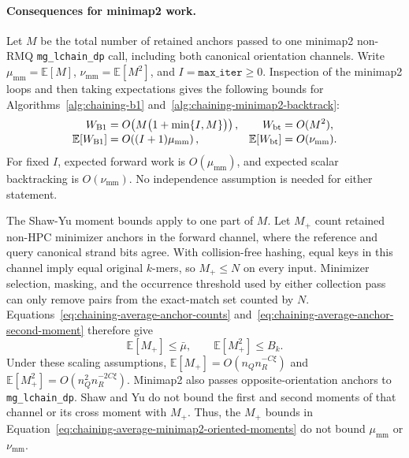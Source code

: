 \paragraph{Consequences for minimap2 work.}
Let \(M\) be the total number of retained anchors passed to one minimap2
non-RMQ \texttt{mg\_lchain\_dp} call, including both canonical orientation
channels. Write
\(\mu_{\mathrm{mm}}=\mathbb E[M]\),
\(\nu_{\mathrm{mm}}=\mathbb E[M^2]\), and
\(I=\texttt{max\_iter}\geq0\). Inspection of the minimap2 loops and then
taking expectations gives the following bounds for
Algorithms~\ref{alg:chaining-b1} and~\ref{alg:chaining-minimap2-backtrack}:
\begin{align}
  W_{\mathrm{B1}}
    &=O\!\left(M\bigl(1+\min\{I,M\}\bigr)\right),
  &W_{\mathrm{bt}}&=O(M^2),\notag\\[-2pt]
  \mathbb E[W_{\mathrm{B1}}]
    &=O\!\left((I+1)\mu_{\mathrm{mm}}\right),
  &\mathbb E[W_{\mathrm{bt}}]&=O(\nu_{\mathrm{mm}}).
  \label{eq:chaining-minimap2-work-by-anchor-count}
\end{align}
For fixed \(I\), expected forward work is \(O(\mu_{\mathrm{mm}})\), and
expected scalar backtracking is \(O(\nu_{\mathrm{mm}})\). No independence
assumption is needed for either statement.

The Shaw-Yu moment bounds apply to one part of \(M\). Let \(M_+\) count
retained non-HPC minimizer anchors in the forward channel, where the reference
and query canonical strand bits agree. With collision-free hashing, equal keys
in this channel imply equal original \(k\)-mers, so \(M_+\leq N\) on every
input. Minimizer selection, masking, and the occurrence threshold used by
either collection pass can only remove pairs from the exact-match set counted
by \(N\). Equations~\ref{eq:chaining-average-anchor-counts}
and~\ref{eq:chaining-average-anchor-second-moment} therefore give
\begin{equation}
  \mathbb E[M_+]\leq\bar\mu,
  \qquad
  \mathbb E[M_+^2]\leq B_k.
  \label{eq:chaining-average-minimap2-oriented-moments}
\end{equation}
Under these scaling assumptions,
\(\mathbb E[M_+]=O(n_Qn_R^{-C\xi})\) and
\(\mathbb E[M_+^2]=O(n_Q^2n_R^{-2C\xi})\).
Minimap2 also passes opposite-orientation anchors to
\texttt{mg\_lchain\_dp}. Shaw and Yu do not bound the first and second moments
of that channel or its cross moment with \(M_+\). Thus, the \(M_+\) bounds in
Equation~\ref{eq:chaining-average-minimap2-oriented-moments} do not bound
\(\mu_{\mathrm{mm}}\) or \(\nu_{\mathrm{mm}}\).

